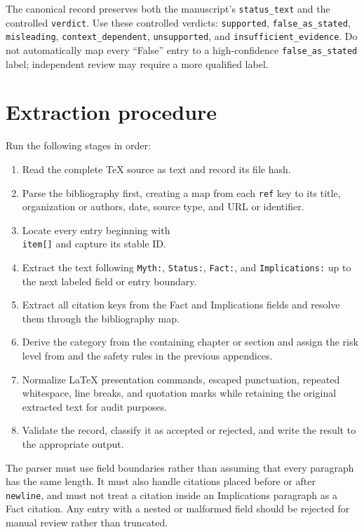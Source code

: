 \documentclass[11pt,oneside]{book}
\begin{document}
The canonical record preserves both the manuscript's \texttt{status\_text} and the controlled \texttt{verdict}. Use these controlled verdicts: \texttt{supported}, \texttt{false\_as\_stated}, \texttt{misleading}, \texttt{context\_dependent}, \texttt{unsupported}, and \texttt{insufficient\_evidence}. Do not automatically map every ``False'' entry to a high-confidence \texttt{false\_as\_stated} label; independent review may require a more qualified label.

\section{Extraction procedure}

Run the following stages in order:

\begin{enumerate}
\item Read the complete TeX source as text and record its file hash.
\item Parse the bibliography first, creating a map from each \texttt{ref} key to its title, organization or authors, date, source type, and URL or identifier.
\item Locate every entry beginning with \texttt{\\item[]} and capture its stable ID.
\item Extract the text following \texttt{Myth:}, \texttt{Status:}, \texttt{Fact:}, and \texttt{Implications:} up to the next labeled field or entry boundary.
\item Extract all citation keys from the Fact and Implications fields and resolve them through the bibliography map.
\item Derive the category from the containing chapter or section and assign the risk level from  and the safety rules in the previous appendices.
\item Normalize LaTeX presentation commands, escaped punctuation, repeated whitespace, line breaks, and quotation marks while retaining the original extracted text for audit purposes.
\item Validate the record, classify it as accepted or rejected, and write the result to the appropriate output.
\end{enumerate}

The parser must use field boundaries rather than assuming that every paragraph has the same length. It must also handle citations placed before or after \texttt{\\newline}, and must not treat a citation inside an Implications paragraph as a Fact citation. Any entry with a nested or malformed field should be rejected for manual review rather than truncated.
\end{document}
